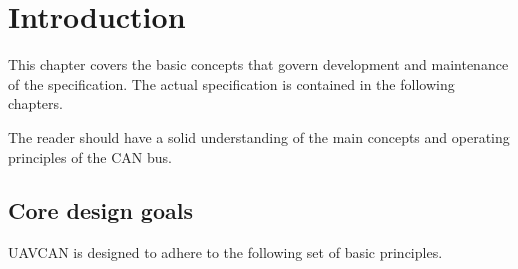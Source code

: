 \chapter{Introduction}\label{sec:introduction}

This chapter covers the basic concepts that govern development and maintenance of the specification.
The actual specification is contained in the following chapters.

The reader should have a solid understanding of the main concepts and operating principles of the CAN bus.

\section{Core design goals}

UAVCAN is designed to adhere to the following set of basic principles.


